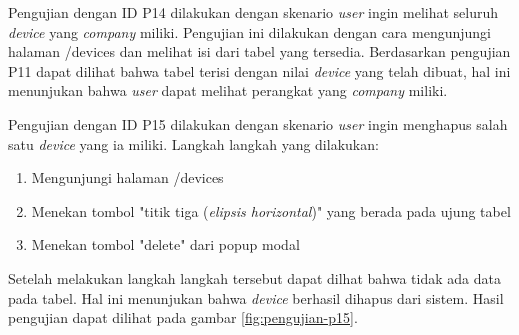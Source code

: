 Pengujian dengan ID P14 dilakukan dengan skenario \textit{user} ingin melihat seluruh \textit{device} yang \textit{company} miliki. Pengujian ini dilakukan dengan cara mengunjungi halaman /devices dan melihat isi dari tabel yang tersedia. Berdasarkan pengujian P11 dapat dilihat bahwa tabel terisi dengan nilai \textit{device} yang telah dibuat, hal ini menunjukan bahwa \textit{user} dapat melihat perangkat yang \textit{company} miliki.

Pengujian dengan ID P15 dilakukan dengan skenario \textit{user} ingin menghapus salah satu \textit{device} yang ia miliki. Langkah langkah yang dilakukan:
\begin{enumerate}
  \item Mengunjungi halaman /devices
  \item Menekan tombol "titik tiga (\textit{elipsis horizontal})" yang berada pada ujung tabel
  \item Menekan tombol "delete" dari popup modal
\end{enumerate}

Setelah melakukan langkah langkah tersebut dapat dilhat bahwa tidak ada data pada tabel. Hal ini menunjukan bahwa \textit{device} berhasil dihapus dari sistem. Hasil pengujian dapat dilihat pada gambar \ref{fig:pengujian-p15}.
